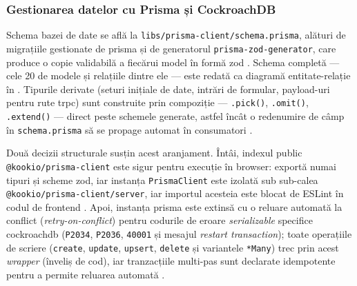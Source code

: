 \subsubsection{Gestionarea datelor cu Prisma și CockroachDB}\label{subsec:gestionarea-datelor}

Schema bazei de date se află la \texttt{libs/prisma-client/schema.prisma}, alături de migrațiile gestionate de \gls{prisma} și de generatorul \texttt{prisma-zod-generator}, care produce o copie validabilă a fiecărui model în formă \gls{zod} \cite{prisma_orm,prisma_zod_generator}. Schema completă --- cele 20 de modele și relațiile dintre ele --- este redată ca diagramă entitate-relație în . Tipurile derivate (seturi inițiale de date, intrări de formular, payload-uri pentru rute \gls{trpc}) sunt construite prin compoziție --- \texttt{.pick()}, \texttt{.omit()}, \texttt{.extend()} --- direct peste schemele generate, astfel încât o redenumire de câmp în \texttt{schema.prisma} să se propage automat în consumatori \cite{prisma_zod_generator}.

Două decizii structurale susțin acest aranjament. Întâi, indexul public \texttt{@kookio/prisma-client} este sigur pentru execuție în browser: exportă numai tipuri și scheme \gls{zod}, iar instanța \texttt{PrismaClient} este izolată sub sub-calea \texttt{@kookio/prisma-client/server}, iar importul acesteia este blocat de ESLint în codul de frontend \cite{prisma_orm}. Apoi, instanța \gls{prisma} este extinsă cu o reluare automată la conflict (\textit{retry-on-conflict}) pentru codurile de eroare \textit{serializable} specifice \gls{cockroachdb} (\texttt{P2034}, \texttt{P2036}, \texttt{40001} și mesajul \textit{restart transaction}); toate operațiile de scriere (\texttt{create}, \texttt{update}, \texttt{upsert}, \texttt{delete} și variantele \texttt{*Many}) trec prin acest \textit{wrapper} (înveliș de cod), iar tranzacțiile multi-pas sunt declarate idempotente pentru a permite reluarea automată \cite{prisma_transactions,cockroachdb}.

